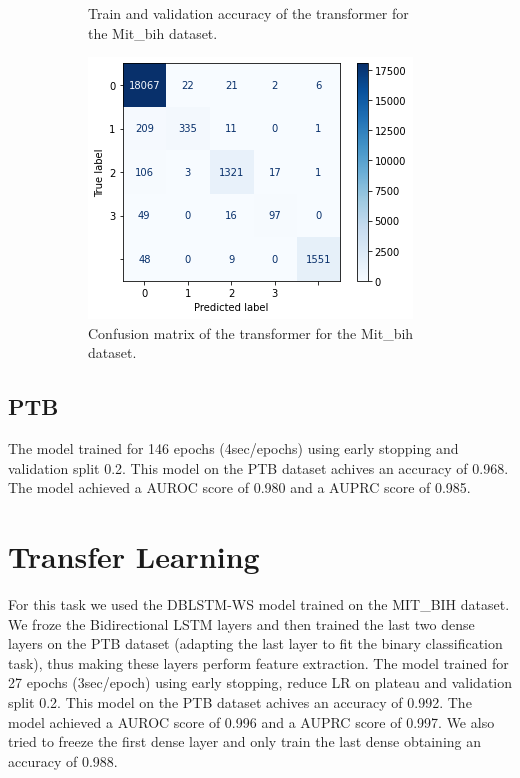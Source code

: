 \documentclass[11pt]{scrartcl}
\begin{document}
\begin{figure}[H]
\begin{subfigure}{.30\textwidth}
		\caption{Train and validation accuracy of the transformer for the Mit\_bih dataset.}
	\end{subfigure}
	\begin{subfigure}{.30\textwidth}
		\centering
		\includegraphics[width=.95\linewidth]{../models_performance_graphs/mit/transformer_mit_confusion.png}  
		\caption{Confusion matrix of the transformer for the Mit\_bih dataset.}
	\end{subfigure}
	\label{FIGURE LABEL 1}
	\caption{}
\end{figure}

\subsection{PTB}
The model trained for 146 epochs (4sec/epochs) using early stopping and validation split 0.2.
This model on the PTB dataset achives an accuracy of 0.968. The model achieved a AUROC score of 0.980 and a AUPRC score of 0.985.

\section{Transfer Learning}
For this task we used the DBLSTM-WS model trained on the MIT\_BIH dataset. We froze the Bidirectional LSTM layers and then trained the last two dense layers on the PTB dataset (adapting the last layer to fit the binary classification task), thus making these layers perform feature extraction. The model trained for 27 epochs (3sec/epoch) using early stopping, reduce LR on plateau and validation split 0.2.
This model on the PTB dataset achives an accuracy of 0.992. The model achieved a AUROC score of 0.996 and a AUPRC score of 0.997. We also tried to freeze the first dense layer and only train the last dense obtaining an accuracy of 0.988.
\end{document}
